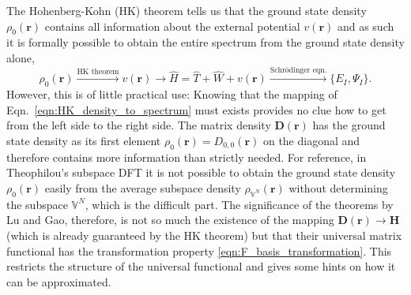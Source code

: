 \documentclass[journal=jpclcd,manuscript=letter]{achemso}
\newcommand\m[1]{\mathbf{#1}}
\renewcommand\vec[1]{\mathbf{#1}}
\begin{document}
The Hohenberg-Kohn (HK) theorem \cite{Hohenberg1964inhomogeneous} tells us that the ground state density $\rho_0(\vec{r})$
contains all information about the external potential $v(\vec{r})$
and as such it is formally possible to obtain the entire spectrum from the ground state density alone,
\begin{equation}
\rho_{0}(\vec{r}) \xrightarrow{\text{HK theorem}} v(\vec{r}) \longrightarrow \hat{H} = \hat{T} + \hat{W} + v(\vec{r}) \xrightarrow{\text{Schr\"{o}dinger eqn.}} \{ E_I, \Psi_I \}.
\label{eqn:HK_density_to_spectrum}
\end{equation}
However, this is of little practical use: Knowing that the mapping of Eqn.~\ref{eqn:HK_density_to_spectrum}
must exists provides no clue how to get from the left side to the right side.
 The matrix density $\m{D}(\vec{r})$ has the ground state density as its first element $\rho_{0}(\vec{r}) = D_{0,0}(\vec{r})$ on the diagonal
and therefore contains more information than strictly needed. For reference, in Theophilou's subspace DFT it is not possible to obtain the
ground state density $\rho_0(\vec{r})$ easily from the average subspace density $\rho_{\mathbb{V}^N}(\vec{r})$ without determining the subspace
$\mathbb{V}^N$, which is the difficult part.
The significance of the theorems by Lu and Gao, therefore, is not so much the existence of the mapping $\m{D}(\vec{r}) \to \m{H}$ (which is already
guaranteed by the HK theorem) but that their
universal matrix functional has the transformation property \ref{eqn:F_basis_transformation}.
This restricts the structure of the universal functional and gives some hints on how it can be approximated.
\end{document}
